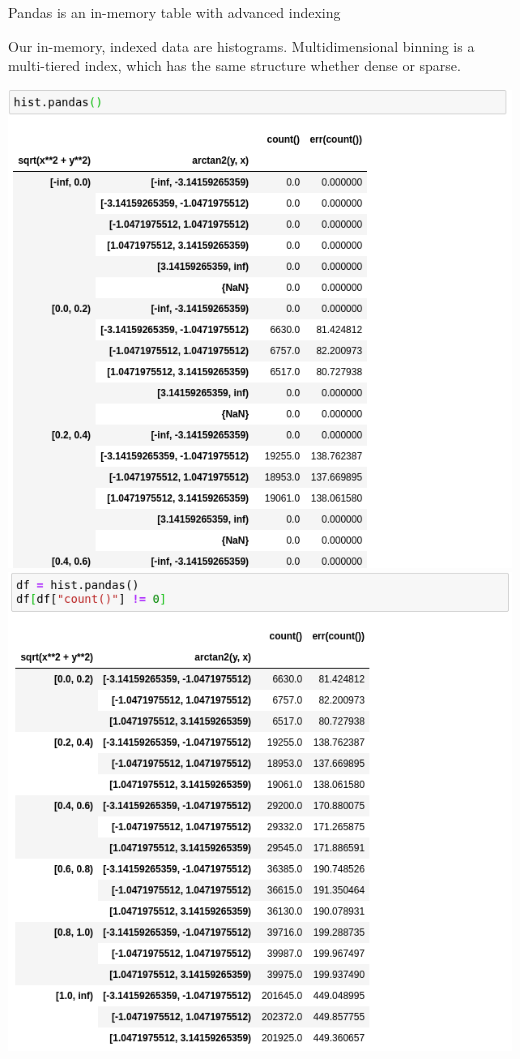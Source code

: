 \documentclass[aspectratio=169]{beamer}
\begin{document}
\begin{frame}{Pandas is an in-memory table with advanced indexing}
\large
\vspace{0.5 cm}

Our in-memory, indexed data are histograms. Multidimensional binning is a multi-tiered index, which has the same structure whether dense or sparse.

\vspace{0.25 cm}
\includegraphics[width=0.5\linewidth]{histbook-pandas-1.png} \hfill \includegraphics[width=0.5\linewidth]{histbook-pandas-2.png}
\end{frame}
\end{document}
